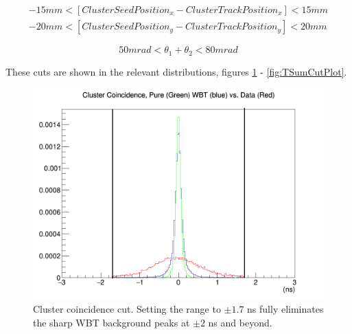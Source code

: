 \documentclass{article}
\begin{document}
          \begin{equation} \label{eq:MatchingCut}
	\begin{split}
  	-15mm < [Cluster Seed Position_{x} - Cluster Track Position_{x}] < 15mm
  	\\-20mm < [Cluster Seed Position_{y} - Cluster Track Position_{y}] < 20mm
	\end{split}
	\end{equation}

	\begin{equation} \label{eq:TSumCutMeow}
  	50 mrad < \theta_1+ \theta_2 < 80 mrad
	\end{equation}\newline
	
	These cuts are shown in the relevant distributions, figures \ref{fig:CoinCutPlot} - \ref{fig:TSumCutPlot}.

	\begin{figure}[H]
  	\includegraphics[width=\linewidth]{MollerPlots/ALL_Coincidence}
  	\caption{Cluster coincidence cut. Setting the range to $\pm1.7$ ns fully eliminates the sharp WBT background peaks at $\pm2$ ns and beyond.}
  	\label{fig:CoinCutPlot}
	\end{figure}
\end{document}
